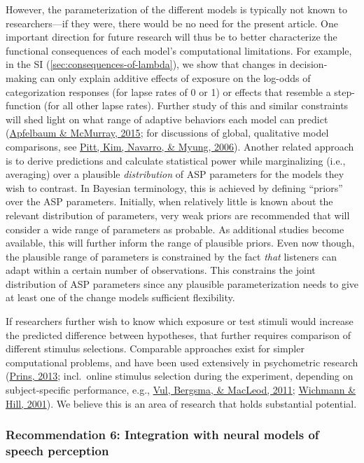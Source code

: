 \documentclass[
  11pt,
  english,
  man,floatsintext]{apa6}
\begin{document}
However, the parameterization of the different models is typically not known to researchers---if they were, there would be no need for the present article. One important direction for future research will thus be to better characterize the functional consequences of each model's computational limitations. For example, in the SI (\ref{sec:consequences-of-lambda}), we show that changes in decision-making can only explain additive effects of exposure on the log-odds of categorization responses (for lapse rates of 0 or 1) or effects that resemble a step-function (for all other lapse rates). Further study of this and similar constraints will shed light on what range of adaptive behaviors each model can predict (\protect\hyperlink{ref-apfelbaum-mcmurray2015}{Apfelbaum \& McMurray, 2015}; for discussions of global, qualitative model comparisons, see \protect\hyperlink{ref-pitt2006}{Pitt, Kim, Navarro, \& Myung, 2006}). Another related approach is to derive predictions and calculate statistical power while marginalizing (i.e., averaging) over a plausible \emph{distribution} of ASP parameters for the models they wish to contrast. In Bayesian terminology, this is achieved by defining ``priors'' over the ASP parameters. Initially, when relatively little is known about the relevant distribution of parameters, very weak priors are recommended that will consider a wide range of parameters as probable. As additional studies become available, this will further inform the range of plausible priors. Even now though, the plausible range of parameters is constrained by the fact \emph{that} listeners can adapt within a certain number of observations. This constrains the joint distribution of ASP parameters since any plausible parameterization needs to give at least one of the change models sufficient flexibility.

If researchers further wish to know which exposure or test stimuli would increase the predicted difference between hypotheses, that further requires comparison of different stimulus selections. Comparable approaches exist for simpler computational problems, and have been used extensively in psychometric research (\protect\hyperlink{ref-prins2013}{Prins, 2013}; incl.~online stimulus selection during the experiment, depending on subject-specific performance, e.g., \protect\hyperlink{ref-vul2011}{Vul, Bergsma, \& MacLeod, 2011}; \protect\hyperlink{ref-wichmann-hill2001}{Wichmann \& Hill, 2001}). We believe this is an area of research that holds substantial potential.

\hypertarget{recommendation-6-integration-with-neural-models-of-speech-perception}{%
\subsubsection{Recommendation 6: Integration with neural models of speech perception}\label{recommendation-6-integration-with-neural-models-of-speech-perception}}
\end{document}
